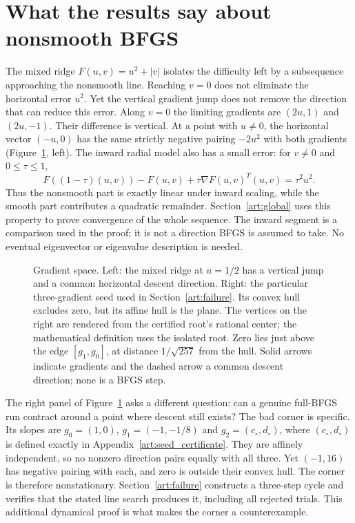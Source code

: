 \section{What the results say about nonsmooth BFGS}\label{art:geometry}

The mixed ridge $F(u,v)=u^2+|v|$ isolates the difficulty left by a
subsequence approaching the nonsmooth line. Reaching $v=0$ does not eliminate
the horizontal error $u^2$. Yet the vertical gradient jump does not remove
the direction that can reduce this error. Along $v=0$ the limiting gradients are $(2u,1)$ and
$(2u,-1)$. Their difference is vertical. At a point with $u\ne0$, the
horizontal vector $(-u,0)$ has the same strictly negative pairing $-2u^2$
with both gradients (Figure~\ref{art:gradient-geometry}, left). The inward
radial model also has a small error: for $v\ne0$ and $0\le\tau\le1$,
\begin{equation}\label{art:mixed-inward-remainder}
 F((1-\tau)(u,v))-F(u,v)+\tau\nabla F(u,v)^T(u,v)
       =\tau^2u^2.
\end{equation}
Thus the nonsmooth part is exactly linear under inward scaling, while the
smooth part contributes a quadratic remainder. Section~\ref{art:global}
uses this property to prove convergence of the whole sequence. The inward
segment is a comparison used in the proof; it is not a direction BFGS is
assumed to take. No eventual eigenvector or eigenvalue description is needed.

\begin{figure}[htbp]
\centering

\caption{Gradient space. Left: the mixed ridge at $u=1/2$ has a vertical
jump and a common horizontal descent direction. Right: the particular
three-gradient seed used in Section~\ref{art:failure}. Its convex hull
excludes zero, but its affine hull is the plane. The vertices on the right
are rendered from the certified root's rational center; the mathematical
definition uses the isolated root.
Zero lies just above the edge $[g_1,g_0]$, at distance $1/\sqrt{257}$ from the
hull. Solid arrows indicate gradients and the dashed arrow a common descent
direction; none is a BFGS step.}
\label{art:gradient-geometry}
\end{figure}

The right panel of Figure~\ref{art:gradient-geometry} asks a different question: can a genuine full-BFGS run
contract around a point where descent still exists? The bad corner is specific. Its slopes
are $g_0=(1,0)$, $g_1=(-1,-1/8)$ and $g_2=(c_\circ,d_\circ)$, where $(c_\circ,d_\circ)$ is
defined exactly in Appendix~\ref{art:seed_certificate}. They are affinely
independent, so no nonzero direction pairs equally with all three. Yet
$(-1,16)$ has negative pairing with each, and zero is outside their convex
hull. The corner is therefore nonstationary. Section~\ref{art:failure}
constructs a three-step cycle and verifies that the stated line search
produces it, including all rejected trials. This additional dynamical proof
is what makes the corner a counterexample.

